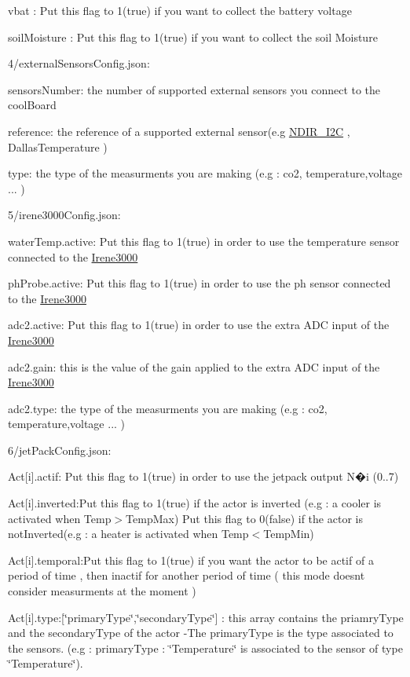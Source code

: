 vbat \+: Put this flag to 1(true) if you want to collect the battery voltage

soil\+Moisture \+: Put this flag to 1(true) if you want to collect the soil Moisture

4/external\+Sensors\+Config.\+json\+:

sensors\+Number\+: the number of supported external sensors you connect to the cool\+Board

reference\+: the reference of a supported external sensor(e.\+g \hyperlink{class_n_d_i_r___i2_c}{N\+D\+I\+R\+\_\+\+I2C} , Dallas\+Temperature )

type\+: the type of the measurments you are making (e.\+g \+: co2, temperature,voltage ... )

5/irene3000\+Config.\+json\+:

water\+Temp.\+active\+: Put this flag to 1(true) in order to use the temperature sensor connected to the \hyperlink{class_irene3000}{Irene3000}

ph\+Probe.\+active\+: Put this flag to 1(true) in order to use the ph sensor connected to the \hyperlink{class_irene3000}{Irene3000}

adc2.\+active\+: Put this flag to 1(true) in order to use the extra A\+DC input of the \hyperlink{class_irene3000}{Irene3000}

adc2.\+gain\+: this is the value of the gain applied to the extra A\+DC input of the \hyperlink{class_irene3000}{Irene3000}

adc2.\+type\+: the type of the measurments you are making (e.\+g \+: co2, temperature,voltage ... )

6/jet\+Pack\+Config.\+json\+:

Act\mbox{[}i\mbox{]}.actif\+: Put this flag to 1(true) in order to use the jetpack output N�i (0..7)

Act\mbox{[}i\mbox{]}.inverted\+:Put this flag to 1(true) if the actor is inverted (e.\+g \+: a cooler is activated when Temp$>$Temp\+Max) Put this flag to 0(false) if the actor is not\+Inverted(e.\+g \+: a heater is activated when Temp$<$Temp\+Min)

Act\mbox{[}i\mbox{]}.temporal\+:Put this flag to 1(true) if you want the actor to be actif of a period of time , then inactif for another period of time ( this mode doesn\textquotesingle{}t consider measurments at the moment )

Act\mbox{[}i\mbox{]}.type\+:\mbox{[}\char`\"{}primary\+Type\char`\"{},\char`\"{}secondary\+Type\char`\"{}\mbox{]} \+: this array contains the priamry\+Type and the secondary\+Type of the actor -\/\+The primary\+Type is the type associated to the sensors. (e.\+g \+: primary\+Type \+: \char`\"{}\+Temperature\char`\"{} is associated to the sensor of type \char`\"{}\+Temperature\char`\"{}).

